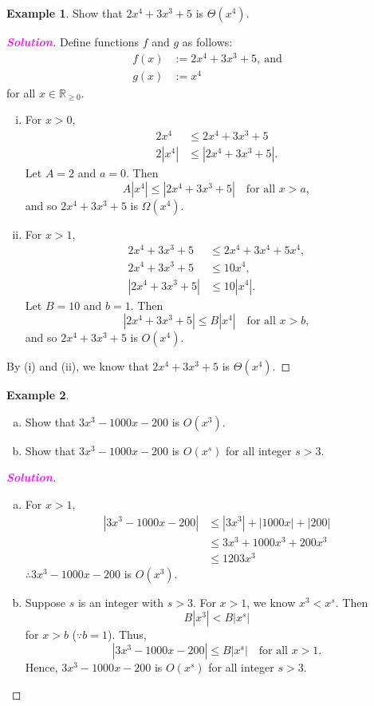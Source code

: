 \documentclass[12pt,openany]{book}
\theoremstyle{definition}
\newtheorem{example}{Example}[chapter]
\newcommand{\R}{\mathbb{R}}
\newcommand{\sol}{\textcolor{magenta}{\bf Solution}}
\begin{document}
	\newpage
	\begin{example}
		Show that \(2x^4+3x^3+5\) is $\Theta(x^4)$.
		\begin{proof}[\sol]
			Define functions $f$ and $g$ as follows: \begin{align*}
				f(x)&:=2x^4+3x^3+5,\ \text{and}\\
				g(x)&:=x^4
			\end{align*} for all $x\in\R_{\geq 0}$.
			\begin{enumerate}[(i)]
				\item For $x>0$, \begin{align*}
					2x^4&\leq 2x^4+3x^3+5\\
					2|x^4|&\leq |2x^4+3x^3+5|.
				\end{align*} Let $A=2$ and $a=0$. Then \[
				A|x^4|\leq |2x^4+3x^3+5|\quad\text{for all $x>a$},
				\] and so $2x^4+3x^3+5$ is \(\Omega(x^4)\).
				\item For $x>1$, \begin{align*}
					2x^4+3x^3+5&\leq 2x^4+3x^4+5x^4,\\
					2x^4+3x^3+5&\leq 10x^4,\\
					|2x^4+3x^3+5|&\leq 10|x^4|.
				\end{align*} Let $B=10$ and $b=1$. Then \[
			|2x^4+3x^3+5|\leq B|x^4|\quad\text{for all $x>b$},
		\] and so $2x^4+3x^3+5$ is \(O(x^4)\).
			\end{enumerate}
			By (i) and (ii), we know that $2x^4+3x^3+5$ is $\Theta(x^4)$.
		\end{proof}
	\end{example}
	\vspace{8pt}
	\begin{example}
		\ \begin{enumerate}[a.]
			\item Show that \(3x^3-1000x-200\) is $O(x^3)$.
			\item Show that \(3x^3-1000x-200\) is $O(x^s)$ for all integer $s>3$.
		\end{enumerate}
		\begin{proof}[\sol]
			\begin{enumerate}[a.]
				\item For $x>1$, \begin{align*}
					|3x^3-1000x-200|&\leq|3x^3|+|1000x|+|200|\\
					&\leq 3x^3+1000x^3+200x^3\\
					&\leq 1203x^3
				\end{align*}
			\(\therefore 3x^3-1000x-200\) is $O(x^3)$.
			\item Suppose $s$ is an integer with $s>3$. For $x>1$, we know $x^3<x^s$. Then \[
			B|x^3|< B|x^s|
			\] for $x>b$ ($\because b=1$). Thus, \[
			|3x^3-1000x-200|\leq B|x^s|\quad\text{for all $x>1$}.
			\] Hence, $3x^3-1000x-200$ is $O(x^s)$ for all integer $s>3$.
			\end{enumerate}
		\end{proof}
	\end{example}
\end{document}
